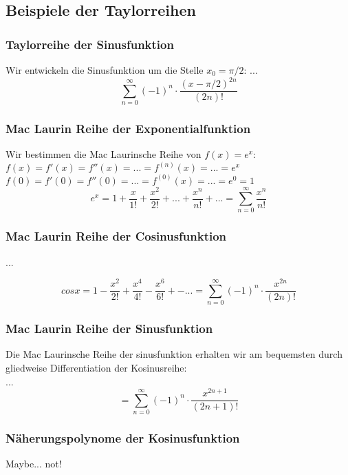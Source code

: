 \subsection{Beispiele der Taylorreihen}
\subsubsection*{Taylorreihe der Sinusfunktion}
Wir entwickeln die Sinusfunktion um die Stelle $x_0 = \pi / 2$:
...
$$ \sum\limits_{n=0}^{\infty} (-1)^n \cdot \frac{(x-\pi / 2)^{2n}}{(2n)!}$$

\subsubsection*{Mac Laurin Reihe der Exponentialfunktion}
Wir bestimmen die Mac Laurinsche Reihe von $f(x) = e^x$:\\
$f(x) = f'(x) = f''(x) = ... = f^{(n)}(x) = ... = e^x$\\
$f(0) = f'(0) = f''(0) = ... = f^{(0)}(x) = ... = e^0 = 1$
$$e^x = 1 + \frac{x}{1!} + \frac{x^2}{2!} + ... + \frac{x^n}{n!} + ... = \sum\limits_{n=0}^{\infty} \frac{x^n}{n!}$$

\subsubsection*{Mac Laurin Reihe der Cosinusfunktion}
...
\begin{formel}
$$cos x = 1 - \frac{x^2}{2!} + \frac{x^4}{4!} - \frac{x^6}{6!} +- ... =  \sum\limits_{n=0}^{\infty}(-1)^n \cdot \frac{x^{2n}}{(2n)!}$$
\end{formel}

\subsubsection*{Mac Laurin Reihe der Sinusfunktion}
Die Mac Laurinsche Reihe der sinusfunktion erhalten wir am bequemsten durch gliedweise Differentiation der Kosinusreihe:
\\...\\
$$ = \sum\limits_{n=0}^{\infty} (-1)^n \cdot \frac{x^{2n+1}}{(2n+1)!}$$

\subsubsection*{Näherungspolynome der Kosinusfunktion}
Maybe... not!

